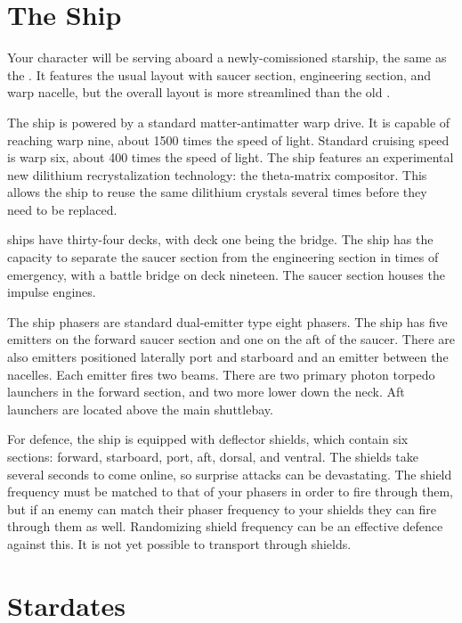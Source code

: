 \documentclass[12pt]{article}
\begin{document}
\section{The Ship}

Your character will be serving aboard a newly-comissioned 
starship, the same as the . It features the usual
layout with saucer section, engineering section, and warp nacelle, but the
overall layout is more streamlined than the old .

The ship is powered by a standard matter-antimatter warp drive. It is capable
of reaching warp nine, about 1500 times the speed of light. Standard cruising
speed is warp six, about 400 times the speed of light. The ship features an
experimental new dilithium recrystalization technology: the theta-matrix
compositor. This allows the ship to reuse the same dilithium crystals several
times before they need to be replaced.

 ships have thirty-four decks, with deck one being the bridge.
The ship has the capacity to separate the saucer section from the engineering
section in times of emergency, with a battle bridge on deck nineteen. The
saucer section houses the impulse engines.

The ship phasers are standard dual-emitter type eight phasers. The ship has
five emitters on the forward saucer section and one on the aft of the saucer.
There are also emitters positioned laterally port and starboard and an emitter
between the nacelles. Each emitter fires two beams. There are two primary
photon torpedo launchers in the forward section, and two more lower down the
neck. Aft launchers are located above the main shuttlebay.

For defence, the ship is equipped with deflector shields, which contain six
sections: forward, starboard, port, aft, dorsal, and ventral. The shields take
several seconds to come online, so surprise attacks can be devastating. The
shield frequency must be matched to that of your phasers in order to fire
through them, but if an enemy can match their phaser frequency to your shields
they can fire through them as well. Randomizing shield frequency can be an
effective defence against this. It is not yet possible to transport through
shields.

\section{Stardates}
\end{document}
